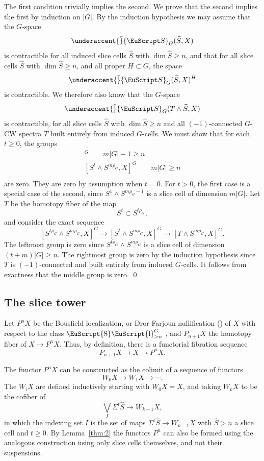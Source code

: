 \documentclass{amsart}
\theoremstyle{definition}
\theoremstyle{remark}
\newenvironment{pf}{\bigskip{\em Proof:\/}}{\qed\medskip}
\newcommand{\spectra}{\EuScript S}
\DeclareMathOperator{\slicesymbol}{\EuScript{S}\EuScript{l}}
\newcommand{\gslice}[1]{\slicesymbol^{G}_{>{#1}}}
\newcommand{\gspectra}[1]{\underaccent{\bar}{\spectra}_{#1}}
\newcommand{\slicecell}{\widehat{S}}
\begin{document}
\begin{pf}
The first condition trivially implies the second.  We prove that the
second implies the first by induction on $|G|$.  By the induction
hypothesis we may assume that the $G$-space
\[
\gspectra{G}(\slicecell,X)
\]
is contractible for all induced slice cells $\slicecell$ with $\dim
\slicecell\ge n$, and that for all slice cells $\slicecell$ with
$\dim\slicecell\ge n$, and all proper $H\subset G$, the space
\[
\gspectra{G}(\slicecell,X)^{H}
\]
is contractible.   We therefore also know that the $G$-space 
\[
\gspectra{G}(T\wedge\slicecell, X)
\]
is contractible, for all slice cells $\slicecell$ with
$\dim\slicecell\ge n$ and all $(-1)$-connected $G$-CW spectra $T$
built entirely from induced $G$-cells.   We must show that for each
$t \ge 0$, the groups 
\begin{gather*}
[S^{t}\wedge S^{m\rho_{G}-1},X]^{G} \qquad m|G|-1\ge n \\
[S^{t}\wedge S^{m\rho_{G}},X]^{G} \qquad m|G|\ge n \\
\end{gather*}
are zero.  They are zero by assumption when $t=0$.  For $t>0$, the
first case is a special case of the second, since $S^{1}\wedge
S^{m\rho_{G}-1}$ is a slice cell of dimension $m|G|$.  Let $T$ be the
homotopy fiber of the map
\[
S^{t}\subset S^{t\rho_{G}}, 
\]
and consider the exact sequence
\[
[S^{t\rho_{G}}\wedge S^{m\rho_{G}},X]^{G}
\to
[S^{t}\wedge S^{m\rho_{G}},X]^{G}
\to
[T\wedge S^{m\rho_{G}},X]^{G}.
\]
The leftmost group is zero since $S^{t\rho_{G}}\wedge S^{m\rho_{G}}$
is a slice cell of dimension $(t+m)|G|\ge n$.  The rightmost group is
zero by the induction hypothesis since $T$ is $(-1)$-connected and
built entirely from induced $G$-cells.  It follows from exactness that
the middle group is zero.
\end{pf}

\subsection{The slice tower}\label{sec:slice-tower}

Let $P^{n} X$ be the Bousfield localization, or Dror Farjoun
nullification (\cite{MR1320991,hirschhorn03:_model}) of $X$ with
respect to the class $\gslice{n}$ , and $P_{n+1}X$ the homotopy fiber
of $X\to P^{n}X$.  Thus, by definition, there is a functorial
fibration sequence
\[
P_{n+1}X\to X \to P^{n}X.
\]

The functor $P^{n}X$ can be constructed as the colimit of a sequence
of functors
\[
W_{0}X\to W_{1}X\to\cdots.
\]
The $W_{i}X$ are defined inductively starting with $W_{0}X=X$, and
taking $W_{k}X$ to be the cofiber of
\[
\bigvee_{I} \Sigma^{t}\slicecell \to W_{k-1}X,
\]
in which the indexing set $I$ is the set of maps
$\Sigma^{t}\slicecell\to W_{k-1}X$ with $\slicecell>n$ a slice cell
and $t\ge 0$.  By Lemma~\ref{thm:2} the functors $P^{n}$ can also be
formed using the analogous construction using only slice cells
themselves, and not their suspensions.  
\end{document}
